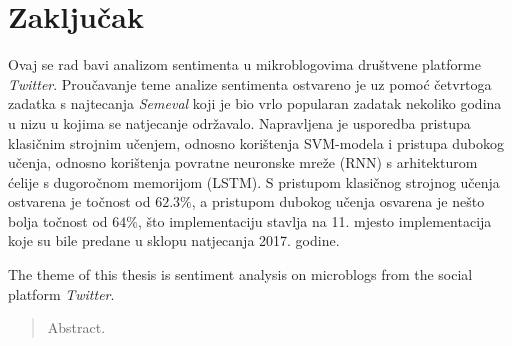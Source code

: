 \documentclass[times, utf8, zavrsni]{fer}
\begin{document}
\chapter{Zaključak}



\printglossaries

\begin{sazetak}
Ovaj se rad bavi analizom sentimenta u mikroblogovima društvene platforme \emph{Twitter}. Proučavanje teme analize sentimenta ostvareno je uz pomoć četvrtoga zadatka s najtecanja \emph{Semeval} koji je bio vrlo popularan zadatak nekoliko godina u nizu u kojima se natjecanje održavalo. Napravljena je usporedba pristupa klasičnim strojnim učenjem, odnosno korištenja \gls{SVM}-modela i pristupa dubokog učenja, odnosno korištenja povratne neuronske mreže (\gls{RNN}) s arhitekturom ćelije s dugoročnom memorijom (\gls{LSTM}). S pristupom klasičnog strojnog učenja ostvarena je točnost od $62.3\%$, a pristupom dubokog učenja osvarena je nešto bolja točnost od $64\%$, što implementaciju stavlja na 11. mjesto implementacija koje su bile predane u sklopu natjecanja 2017. godine.

\end{sazetak}

The theme of this thesis is sentiment analysis on microblogs from the social platform \emph{Twitter}. %

\begin{abstract}
Abstract.

\end{abstract}
\end{document}
